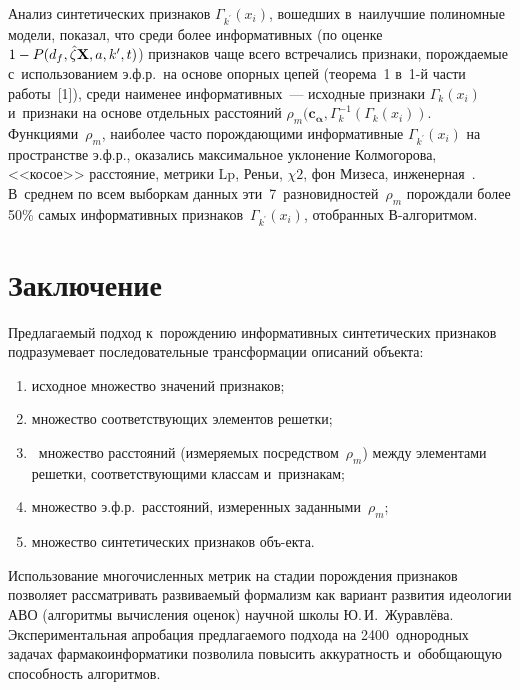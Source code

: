 \begin{multicols}{2}
     
     Анализ синтетических признаков $\Gamma_{k^\prime}(x_i)$, 
вошедших в~наилучшие полиномные модели, показал, что среди более 
информативных (по оценке $1\hm- P(d_f, \hat{\zeta}\mathbf{X},  
a, k^\prime, t)$) признаков чаще всего встречались признаки, порождаемые 
с~использованием э.ф.р.\ на основе опорных цепей (теорема~1 в~1-й части 
работы~[1]), среди наименее информативных~--- исходные признаки 
$\Gamma_k(x_i)$ и~признаки на основе отдельных расстояний 
$\rho_m(\mathbf{c}_{\bm{\alpha}} , \Gamma_k^{-1}(\Gamma_k(x_i))$. 
Функциями~$\rho_m$, наиболее часто порождающими информативные 
$\Gamma_{k^\prime}(x_i)$ на пространстве э.ф.р., оказались максимальное 
уклонение Колмогорова, <<косое>> расстояние, метрики $\mathrm{Lp}$, 
Реньи, $\chi2$, фон Мизеса, инженерная~\cite{2-tor}. В~среднем по всем 
выборкам данных эти~7~разновидностей~$\rho_m$ порождали более 50\% 
самых информативных признаков~$\Gamma_{k^\prime}(x_i)$, отобранных  
В-ал\-го\-рит\-мом.

\vspace*{-6pt}

\section{Заключение}

\vspace*{-2pt}

    Предлагаемый подход к~порождению информативных синтетических 
признаков подразумевает последовательные трансформации описаний 
объекта:\\[-13pt]
\begin{enumerate}[(1)]
\item исходное множество значений признаков;\\[-13.5pt]
\item множество 
соответствующих элементов решетки;\\[-13.5pt] 
\item ~множество расстояний 
(измеряемых посредством~$\rho_m$) между элементами решетки, 
соответствующими классам и~признакам;\\[-13.5pt]
\item множество э.ф.р.\ расстояний, 
измеренных заданными~$\rho_m$;\\[-13.5pt] 
\item множество синтетических признаков 
объ-\linebreak екта.
\end{enumerate}

\noindent
 Использование многочисленных метрик на стадии порождения 
признаков позволяет рассматривать развиваемый формализм как вариант 
развития идеологии АВО (алгоритмы вычисления \mbox{оценок}) научной школы 
Ю.\,И.~Журавлёва. Экспериментальная апробация предлагаемого подхода на 
2400~однородных задачах фармакоинформатики позволила повысить 
аккуратность и~обобщающую способность алгоритмов. 



\end{multicols}
